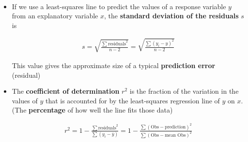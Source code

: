 \documentclass[Main.tex]{subfiles}
\begin{document}
	\begin{exercise} \hfill \\
		\begin{itemize}	
			\item If we use a least-squares line to predict the values of a response variable $y$ from an explanatory variable $x$, the \textbf{standard deviation of the residuals} $s$ is
			
				\begin{definition}
					\begin{subequations}
						\begin{align}
						s=\sqrt{\frac{\sum\text{residuals}^{2}}{n-2}}=\sqrt{\frac{\sum(y_{i}-\hat{y})^{2}}{n-2}}
						\end{align}
					\end{subequations}
				\end{definition} \hfill
				
			This value gives the approximate size of a typical \textbf{prediction error} (residual)\\
			
			\item The \textbf{coefficient of determination} $r^{2}$ is the fraction of the variation in the values of $y$ that is accounted for by the least-squares regression line of $y$ on $x$.\hfill \\
			(The \textbf{percentage} of how well the line fits those data)
			
				\begin{definition}
					\begin{subequations}
						\begin{align}
						r^{2}=1-\frac{\sum\text{residuals}^{2}}{\sum(y_{i}-\bar{y})}=1-\frac{\sum(\text{Obs$-$prediction})^{2}}{\sum(\text{Obs$-$mean Obs})^{2}}
						\end{align}
					\end{subequations}
				\end{definition} \hfill						
		\end{itemize}
	\end{exercise}
	
\end{document}
